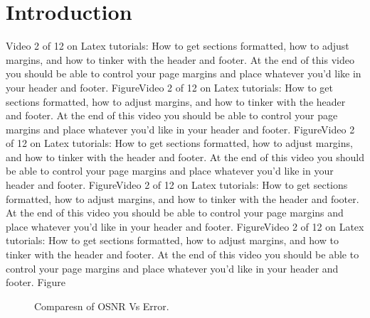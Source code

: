 \documentclass[12pt]{report}
\begin{document}
\section{Introduction}
Video 2 of 12 on Latex tutorials: How to get sections formatted, how to adjust margins, and how to tinker with the header and footer. At the end of this video you should be able to control your page margins and place whatever you'd like in your header and footer. FigureVideo 2 of 12 on Latex tutorials: How to get sections formatted, how to adjust margins, and how to tinker with the header and footer. At the end of this video you should be able to control your page margins and place whatever you'd like in your header and footer. FigureVideo 2 of 12 on Latex tutorials: How to get sections formatted, how to adjust margins, and how to tinker with the header and footer. At the end of this video you should be able to control your page margins and place whatever you'd like in your header and footer. FigureVideo 2 of 12 on Latex tutorials: How to get sections formatted, how to adjust margins, and how to tinker with the header and footer. At the end of this video you should be able to control your page margins and place whatever you'd like in your header and footer. FigureVideo 2 of 12 on Latex tutorials: How to get sections formatted, how to adjust margins, and how to tinker with the header and footer. At the end of this video you should be able to control your page margins and place whatever you'd like in your header and footer. Figure
\begin{figure}[htbp]
	\caption{Comparesn of OSNR Vs Error.}
	\label{fig1}
\end{figure}
\end{document}
